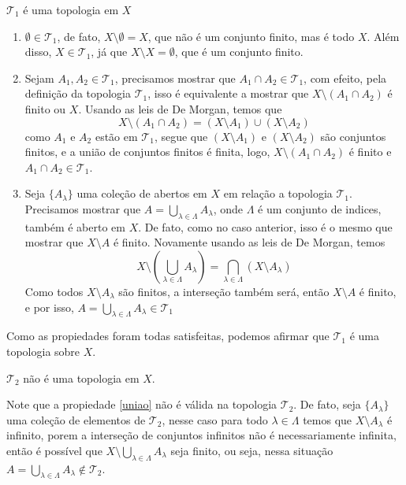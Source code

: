 \documentclass[a4paper, 11pt]{article}
\newcommand{\cT}{\mathcal T}
\begin{document}
$\cT_1$ é uma topologia em $X$
\begin{enumerate}[leftmargin=*]
    \item $\emptyset \in \cT_1$, de fato, $X \setminus \emptyset = X$, que não é um conjunto finito, mas é todo $X$.
    Além disso, $X \in \cT_1$, já que $X \setminus X = \emptyset$, que é um conjunto finito.

    \item Sejam $A_1, A_2 \in \cT_1$, precisamos mostrar que $A_1 \cap A_2 \in \cT_1$, com efeito, pela definição da topologia $\cT_1$, isso é equivalente a mostrar que $X \setminus (A_1 \cap A_2)$ é finito ou $X$.
    Usando as leis de De Morgan, temos que
    \[
        X \setminus (A_1 \cap A_2) = (X \setminus A_1) \cup (X \setminus A_2)
    \]
    como $A_1$ e $A_2$ estão em $\cT_1$, segue que $(X \setminus A_1)$ e $(X \setminus A_2)$ são conjuntos finitos, e a união de conjuntos finitos é finita, logo, $X \setminus (A_1 \cap A_2)$ é finito e $A_1 \cap A_2 \in \cT_1$.

    \item Seja $\{A_\lambda\}$ uma coleção de abertos em $X$ em relação a topologia $\cT_1$.
    Precisamos mostrar que $A = \bigcup_{\lambda \in \Lambda} A_\lambda$, onde $\Lambda$ é um conjunto de indices, também é aberto em $X$.
    De fato, como no caso anterior, isso é o mesmo que mostrar que $X \setminus A$ é finito. Novamente usando as leis de De Morgan, temos
    \[
        X \setminus \left(\bigcup_{\lambda \in \Lambda} A_\lambda \right) = \bigcap_{\lambda \in \Lambda} \left( X \setminus A_\lambda \right)
    \]
    Como todos $X \setminus A_\lambda$ são finitos, a interseção também será, então $X \setminus A$ é finito, e por isso, $A = \bigcup_{\lambda \in \Lambda} A_\lambda \in \cT_1$
\end{enumerate}
Como as propiedades foram todas satisfeitas, podemos afirmar que $\cT_1$ é uma topologia sobre $X$.

$\cT_2$ não é uma topologia em $X$.

\medskip
Note que a propiedade \ref{uniao} não é válida na topologia $\cT_2$.
De fato, seja $\{A_\lambda\}$ uma coleção de elementos de $\cT_2$, nesse caso para todo $\lambda \in \Lambda$ temos que $X \setminus A_\lambda$ é infinito, porem a interseção de conjuntos infinitos não é necessariamente infinita, então é possível que $X \setminus \bigcup_{\lambda \in \Lambda} A_\lambda$ seja finito, ou seja, nessa situação  $A = \bigcup_{\lambda \in \Lambda} A_\lambda \not\in \cT_2$.
\end{document}
